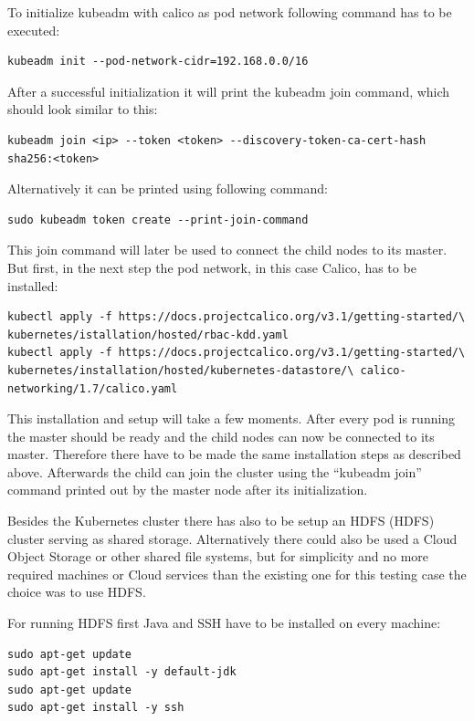 
To initialize kubeadm with calico as pod network following command has to be executed:
\begin{lstlisting}[caption={Initialize Kubernetes master},captionpos=b]
kubeadm init --pod-network-cidr=192.168.0.0/16
\end{lstlisting}
After a successful initialization it will print the kubeadm join command, which should look similar to this:
\begin{lstlisting}[caption={Kubernetes join command},captionpos=b]
kubeadm join <ip> --token <token> --discovery-token-ca-cert-hash sha256:<token>
\end{lstlisting}
Alternatively it can be printed using following command:
\begin{lstlisting}[caption={Kubernetes print join command},captionpos=b]
sudo kubeadm token create --print-join-command 
\end{lstlisting}
This join command will later be used to connect the child nodes to its master. But first, in the next step the pod network, in this case Calico, has to be installed:
\begin{lstlisting}[caption={Install pod network for Kubernetes cluster},captionpos=b]
kubectl apply -f https://docs.projectcalico.org/v3.1/getting-started/\ kubernetes/istallation/hosted/rbac-kdd.yaml
kubectl apply -f https://docs.projectcalico.org/v3.1/getting-started/\ kubernetes/installation/hosted/kubernetes-datastore/\ calico-networking/1.7/calico.yaml
\end{lstlisting}

This installation and setup will take a few moments. After every pod is running the master should be ready and the child nodes can now be connected to its master. Therefore there have to be made the same installation steps as described above. Afterwards the child can join the cluster using the ``kubeadm join'' command printed out by the master node after its initialization.

Besides the Kubernetes cluster there has also to be setup an \acs{HDFS} (\acl{HDFS}) cluster serving as shared storage. Alternatively there could also be used a Cloud Object Storage or other shared file systems, but for simplicity and no more required machines or Cloud services than the existing one for this testing case the choice was to use HDFS.

For running HDFS first Java and \acs{SSH} have to be installed on every machine:
\begin{lstlisting}[caption={HDFS requirements installation},captionpos=b]
sudo apt-get update
sudo apt-get install -y default-jdk
sudo apt-get update
sudo apt-get install -y ssh
\end{lstlisting}

